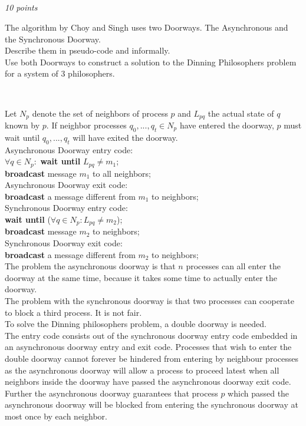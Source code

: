 \documentclass[a4paper]{article}
\newcommand{\points}[1]{\subsection{} \textit{#1 points}\\}
\newcommand{\question}[2][]{
  \parbox[t]{\textwidth}{
    \ifthenelse{\equal{#1}{}}{}{#1)}
    \parbox[t]{0.95\textwidth}{#2}}\\}
\newcommand{\solution}[2][]{
  \ifthenelse{\equal{#1}{} \or \equal{#1}{a}}{\\[3pt]\textit{Solution: }\\[0.1cm]}{}
  \parbox[t]{\textwidth}{
    \ifthenelse{\equal{#1}{}}{}{#1)}
    \parbox[t]{0.95\textwidth}{#2}}\\
}
\begin{document}
\points{10}
\question{
  The algorithm by Choy and Singh uses two Doorways. The Asynchronous
  and the Synchronous Doorway. \\ Describe them in pseudo-code and
  informally. \\ Use both Doorways to construct a solution to the
  Dinning Philosophers problem for a system of 3 philosophers.
}
\solution{
  Let $N_p$ denote the set of neighbors of process $p$ and $L_{pq}$
  the actual state of $q$ known by $p$. If neighbor processes
  $q_0,...,q_t \in N_p$ have entered the doorway, $p$ must wait until
  $q_0,...,q_t$ will have exited the doorway.\\[0.1cm]

  Asynchronous Doorway entry code:\\
  $\forall q \in N_p:$ \textbf{wait until} $L_{pq} \neq m_1$;\\
  \textbf{broadcast} message $m_1$ to all neighbors;\\[0.1cm]

  Asynchronous Doorway exit code:\\
  \textbf{broadcast} a message different from $m_1$ to neighbors;\\[0.1cm]

  Synchronous Doorway entry code:\\
  \textbf{wait until} ($\forall q \in N_p: L_{pq} \neq m_2$);\\
  \textbf{broadcast} message $m_2$ to neighbors;\\[0.1cm]

  Synchronous Doorway exit code:\\
  \textbf{broadcast} a message different from $m_2$ to neighbors;\\[0.1cm]

  The problem the asynchronous doorway is that $n$ processes can all
  enter the doorway at the same time, because it takes some time to
  actually enter the doorway.\\[0.1cm]

  The problem with the synchronous doorway is that two processes can
  cooperate to block a third process. It is not fair.\\[0.1cm]

  To solve the Dinning philosophers problem, a double doorway is
  needed.\\
  The entry code consists out of the synchronous doorway entry code
  embedded in an asynchronous doorway entry and exit code. Processes
  that wish to enter the double doorway cannot forever be hindered from
  entering by neighbour processes as the asynchronous doorway will allow
  a process to proceed latest when all neighbors inside the doorway
  have passed the asynchronous doorway exit code. Further the
  asynchronous doorway guarantees that process $p$ which passed the
  asynchronous doorway will be blocked from entering the synchronous
  doorway at most once by each neighbor.

}
\end{document}
